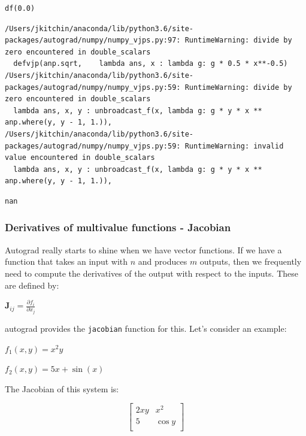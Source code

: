 \documentclass[11pt]{article}
\begin{document}
\begin{verbatim}
df(0.0)
\end{verbatim}

\begin{verbatim}
/Users/jkitchin/anaconda/lib/python3.6/site-packages/autograd/numpy/numpy_vjps.py:97: RuntimeWarning: divide by zero encountered in double_scalars
  defvjp(anp.sqrt,    lambda ans, x : lambda g: g * 0.5 * x**-0.5)
/Users/jkitchin/anaconda/lib/python3.6/site-packages/autograd/numpy/numpy_vjps.py:59: RuntimeWarning: divide by zero encountered in double_scalars
  lambda ans, x, y : unbroadcast_f(x, lambda g: g * y * x ** anp.where(y, y - 1, 1.)),
/Users/jkitchin/anaconda/lib/python3.6/site-packages/autograd/numpy/numpy_vjps.py:59: RuntimeWarning: invalid value encountered in double_scalars
  lambda ans, x, y : unbroadcast_f(x, lambda g: g * y * x ** anp.where(y, y - 1, 1.)),

\end{verbatim}

\begin{verbatim}
nan
\end{verbatim}


\subsubsection{Derivatives of multivalue functions - Jacobian}
\label{sec:org9651967}

Autograd really starts to shine when we have vector functions.  If we have a function that takes an input with \(n\) and produces \(m\) outputs, then we frequently need to compute the derivatives of the output with respect to the inputs. These are defined by:

\(\mathbf{J}_{ij} = \frac{\partial f_i}{\partial x_j}\)

autograd provides the \texttt{jacobian} function for this. Let's consider an example:

\(f_1(x, y) = x^2 y\)

\(f_2(x, y) = 5 x + \sin(x)\)

The Jacobian of this system is:

\begin{equation}
\left[\begin{array}{cc}
2 x y & x^2 \\
5 & \cos y \\
\end{array}\right]
\end{equation}
\end{document}
